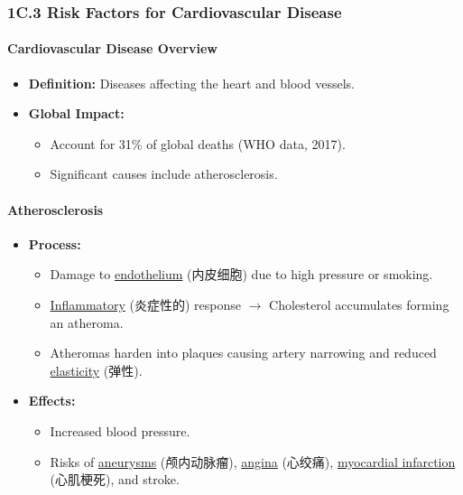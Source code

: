
\subsubsection{1C.3 Risk Factors for Cardiovascular Disease}
\paragraph{Cardiovascular Disease Overview}
\begin{itemize}
    \item \textbf{Definition:} Diseases affecting the heart and blood vessels.
    \item \textbf{Global Impact:}
    \begin{itemize}
        \item Account for 31\% of global deaths (WHO data, 2017).
        \item Significant causes include atherosclerosis.
    \end{itemize}
\end{itemize}

\paragraph{Atherosclerosis}
\begin{itemize}
    \item \textbf{Process:}
    \begin{itemize}
        \item Damage to \underline{endothelium} (内皮细胞) due to high pressure or smoking.
        \item \underline{Inflammatory} (炎症性的) response $\rightarrow$ Cholesterol accumulates forming an atheroma.
        \item Atheromas harden into plaques causing artery narrowing and reduced \underline{elasticity} (弹性).
    \end{itemize}
    \item \textbf{Effects:}
    \begin{itemize}
        \item Increased blood pressure.
        \item Risks of \underline{aneurysms} (颅内动脉瘤), \underline{angina} (心绞痛), \underline{myocardial infarction} (心肌梗死),
        and stroke.
    \end{itemize}
\end{itemize}

